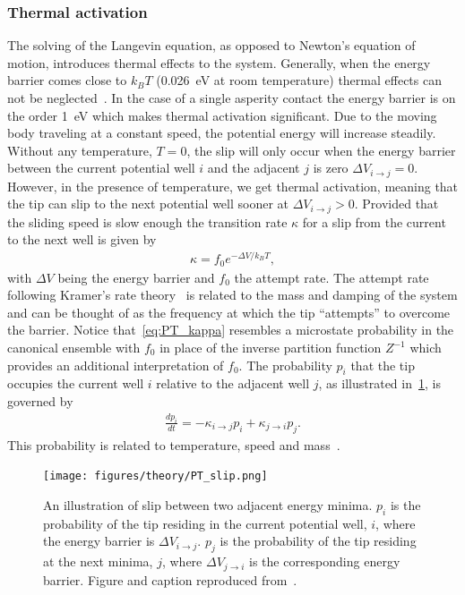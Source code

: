 \subsubsection{Thermal activation}
The solving of the Langevin equation, as opposed to Newton's equation of motion, introduces thermal effects to the system. Generally, when the energy barrier comes close to $k_B T$ (\SI{0.026}{eV} at room temperature) thermal effects can not be neglected~\cite{Yalin_2011}. In the case of a single asperity contact the energy barrier is on the order \SI{1}{eV} which makes thermal activation significant. Due to the moving body traveling at a constant speed, the potential energy will increase steadily. Without any temperature, $T = 0$, the slip will only occur when the energy barrier between the current potential well $i$ and the adjacent $j$ is zero $\Delta V_{i\to j} = 0$. However, in the presence of temperature, we get thermal activation, meaning that the tip can slip to the next potential well sooner at $\Delta V_{i\to j} > 0$. Provided that the sliding speed is slow enough the transition rate $\kappa$ for a slip from the current to the next well is given by
\begin{align}
  \kappa = f_0 e^{-\Delta V / k_B T},
  \label{eq:PT_kappa}
\end{align}
with $\Delta V$ being the energy barrier and $f_0$ the attempt rate. The attempt rate following Kramer’s rate theory~\cite{RevModPhys.62.251} is related to the mass and damping of the system and can be thought of as the frequency at which the tip ``attempts'' to overcome the barrier. Notice that~\cref{eq:PT_kappa} resembles a microstate probability in the canonical ensemble with $f_0$ in place of the inverse partition function $Z^{-1}$ which provides an additional interpretation of $f_0$. The probability $p_i$ that the tip occupies the current well $i$ relative to the adjacent well $j$, as illustrated in~\cref{fig:PT_slip}, is governed by 
\begin{align}
  \frac{dp_i}{dt} = -\kappa_{i\to j}p_i + \kappa_{j\to i}p_j.
  \label{eq:dpdt_PT}
\end{align}
This probability is related to temperature, speed and mass~\cite{Yalin_2011}.

\begin{figure}[H]
  \centering
  \texttt{[image: figures/theory/PT\_slip.png]}
  \caption{An illustration of slip between two adjacent energy minima. $p_i$ is the probability of the tip residing in the current potential well, $i$, where the energy barrier is $\Delta V_{i \rightarrow j}$. $p_j$ is the probability of the tip residing at the next minima, $j$, where $\Delta V_{j \rightarrow i}$ is the corresponding energy barrier. Figure and caption reproduced from~\cite{Yalin_2011}.}
  \label{fig:PT_slip}
\end{figure}


